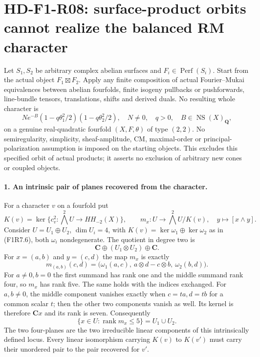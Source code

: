\section[HD-F1-R08: surface products and the balanced RM character]{HD-F1-R08: surface-product orbits cannot realize the balanced RM character}
\label{sec:followup-rm-surface-product-orbit}

Let $S_1,S_2$ be arbitrary complex abelian surfaces and
$F_i\in\operatorname{Perf}(S_i)$. Start from the actual object
$F_1\boxtimes F_2$. Apply any finite composition of actual
Fourier--Mukai equivalences between abelian fourfolds, finite isogeny
pullbacks or pushforwards, line-bundle tensors, translations, shifts
and derived duals. No resulting whole character is
\[
 N e^{-B}(1-q\theta_1^2/2)(1-q\theta_2^2/2),
 \quad N\ne0,\quad q>0,\quad
 B\in\operatorname{NS}(X)_{\mathbf Q},
 \tag{F1R8.1}
\]
on a genuine real-quadratic fourfold $(X,F,\theta)$ of type $(2,2)$.
No semiregularity, simplicity, sheaf-amplitude, CM, maximal-order
or principal-polarization assumption is imposed on the starting
objects. This excludes this specified orbit of actual products;
it asserts no exclusion of arbitrary new cones or coupled objects.

\paragraph{1. An intrinsic pair of planes recovered from the character.}
For a character $v$ on a fourfold put
\[
 K(v)=\ker\{c_v^2:\bigwedge^2U\to HH_{-2}(X)\},\qquad
 m_x:U\longrightarrow\bigwedge^2U/K(v),\quad y\longmapsto[x\wedge y].
 \tag{F1R8.2}
\]
Consider $U=U_1\oplus U_2$, $\dim U_i=4$, with
$K(v)=\ker\omega_1\oplus\ker\omega_2$ as in (F1R7.6), both
$\omega_i$ nondegenerate. The quotient in degree two is
\[
 \mathbf C\oplus(U_1\otimes U_2)\oplus\mathbf C.
\]
For $x=(a,b)$ and $y=(c,d)$ the map $m_x$ is exactly
\[
 m_{(a,b)}(c,d)=
       \bigl(\omega_1(a,c),\ a\otimes d-c\otimes b,\
                              \omega_2(b,d)\bigr).
 \tag{F1R8.3}
\]
For $a\ne0,b=0$ the first summand has rank one and the middle
summand rank four, so $m_x$ has rank five. The same holds with
the indices exchanged. For $a,b\ne0$, the middle component
vanishes exactly when $c=ta,d=tb$ for a common scalar $t$;
then the other two components vanish as well. Its kernel is
therefore $\mathbf Cx$ and its rank is seven. Consequently
\[
 \{x\in U:\operatorname{rank}m_x\le5\}=U_1\cup U_2.
 \tag{F1R8.4}
\]
The two four-planes are the two irreducible linear components
of this intrinsically defined locus. Every linear isomorphism
carrying $K(v)$ to $K(v')$ must carry their unordered pair to
the pair recovered for $v'$.

